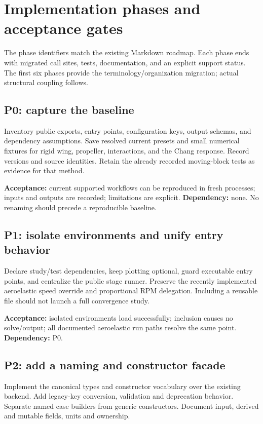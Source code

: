 \documentclass[11pt,a4paper]{article}
\begin{document}
\section{Implementation phases and acceptance gates}
\label{sec:phases}

The phase identifiers match the existing Markdown roadmap. Each phase ends
with migrated call sites, tests, documentation, and an explicit support status.
The first six phases provide the terminology/organization migration; actual
structural coupling follows.

\subsection{P0: capture the baseline}

Inventory public exports, entry points, configuration keys, output schemas,
and dependency assumptions. Save resolved current presets and small numerical
fixtures for rigid wing, propeller, interactions, and the Chang response.
Record versions and source identities. Retain the already recorded moving-block
tests as evidence for that method.

\textbf{Acceptance:} current supported workflows can be reproduced in fresh
processes; inputs and outputs are recorded; limitations are explicit.
\textbf{Dependency:} none. No renaming should precede a reproducible baseline.

\subsection{P1: isolate environments and unify entry behavior}

Declare study/test dependencies, keep plotting optional, guard executable
entry points, and centralize the public stage runner. Preserve the recently
implemented aeroelastic speed override and proportional RPM delegation.
Including a reusable file should not launch a full convergence study.

\textbf{Acceptance:} isolated environments load successfully; inclusion causes
no solve/output; all documented aeroelastic run paths resolve the same point.
\textbf{Dependency:} P0.

\subsection{P2: add a naming and constructor facade}

Implement the canonical types and constructor vocabulary over the existing
backend. Add legacy-key conversion, validation and deprecation behavior.
Separate named case builders from generic constructors. Document input,
derived and mutable fields, units and ownership.
\end{document}
